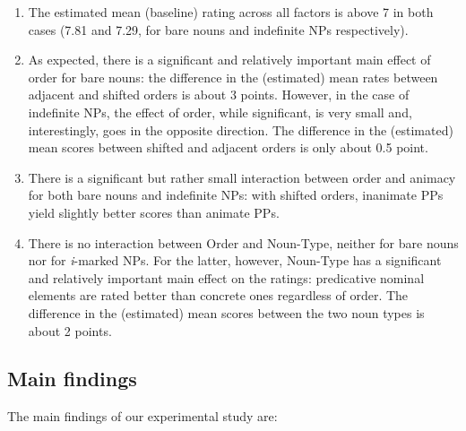 \documentclass[output=paper]{langsci/langscibook}
\begin{document}
\begin{enumerate}
	\item The estimated mean (baseline) rating across all factors is above 7 in both cases (7.81 and 7.29, for bare nouns and indefinite NPs respectively).
	
	\item As expected, there is a significant and relatively important main effect of order for bare nouns: the difference in the (estimated) mean rates between adjacent and shifted orders is about 3 points. 
	However, in the case of indefinite NPs, the effect of order, while significant, is very small and, interestingly, goes in the opposite direction. The difference in the (estimated) mean scores between shifted and adjacent orders is only about 0.5 point. 
	
	\item There is a significant but rather small interaction between order and animacy for both bare nouns and indefinite NPs: with shifted orders, inanimate PPs yield slightly better scores than animate PPs.  
	
	\item There is no interaction between Order and Noun-Type, neither for bare nouns nor for \textit{i}-marked NPs. For the latter, however, Noun-Type has a significant and relatively important main effect on the ratings: predicative nominal elements are rated better than concrete ones regardless of order. The difference in the (estimated) mean  scores between the two noun types is about 2 points.
\end{enumerate}


\subsection{Main findings}

The main findings of our experimental study are:
\end{document}
